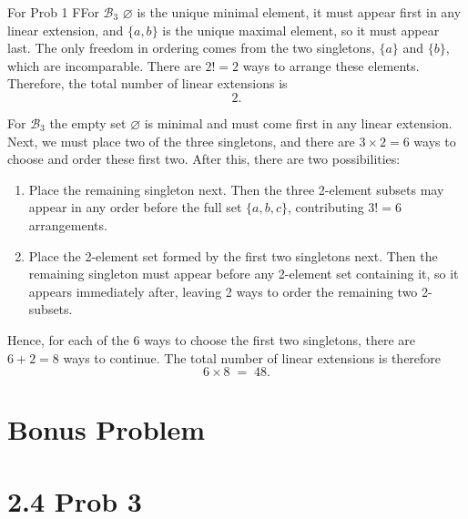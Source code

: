 \documentclass{report}
\begin{document}
\begin{RemarkWithLily}{For Prob 1}
  FFor $\mathcal{B}_3$ $\varnothing$ is the unique minimal element, it must appear first in any linear extension, and $\{a,b\}$ is the unique maximal element, so it must appear last. The only freedom in ordering comes from the two singletons, $\{a\}$ and $\{b\}$, which are incomparable. There are $2! = 2$ ways to arrange these elements. Therefore, the total number of linear extensions is 
  \[
  2.
  \]

  \medskip

  For $\mathcal{B}_3$ the empty set $\varnothing$ is minimal and must come first in any linear extension.  
  Next, we must place two of the three singletons, and there are $3\times 2=6$ ways to choose and order these first two.  
  After this, there are two possibilities:
  \begin{enumerate}
  \item Place the remaining singleton next. Then the three 2-element subsets may appear in any order before the full set $\{a,b,c\}$, contributing $3!=6$ arrangements.
  \item Place the 2-element set formed by the first two singletons next. Then the remaining singleton must appear before any 2-element set containing it, so it appears immediately after, leaving 2 ways to order the remaining two 2-subsets.
  \end{enumerate}
  Hence, for each of the $6$ ways to choose the first two singletons, there are $6 + 2 = 8$ ways to continue.  The total number of linear extensions is therefore
  \[
  6 \times 8 \;=\; 48.
  \]
\end{RemarkWithLily}


\newpage 



\section*{Bonus Problem}



\newpage 

\section*{2.4 Prob 3}
\end{document}
